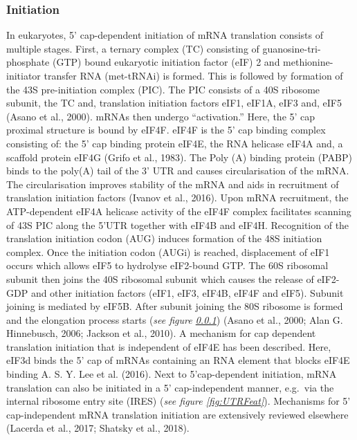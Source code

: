 \documentclass[
  12pt,
  openany]{book}
\begin{document}
\subsubsection{Initiation} \label{initiation}

In eukaryotes, 5' cap-dependent initiation of mRNA translation consists of multiple stages. First, a ternary complex (TC) consisting of guanosine-tri-phosphate (GTP) bound eukaryotic initiation factor (eIF) 2 and methionine-initiator transfer RNA (met-tRNAi) is formed. This is followed by formation of the 43S pre-initiation complex (PIC). The PIC consists of a 40S ribosome subunit, the TC and, translation initiation factors eIF1, eIF1A, eIF3 and, eIF5 (Asano et al., 2000). mRNAs then undergo ``activation.'' Here, the 5' cap proximal structure is bound by eIF4F. eIF4F is the 5' cap binding complex consisting of: the 5' cap binding protein eIF4E, the RNA helicase eIF4A and, a scaffold protein eIF4G (Grifo et al., 1983). The Poly (A) binding protein (PABP) binds to the poly(A) tail of the 3' UTR and causes circularisation of the mRNA. The circularisation improves stability of the mRNA and aids in recruitment of translation initiation factors (Ivanov et al., 2016). Upon mRNA recruitment, the ATP-dependent eIF4A helicase activity of the eIF4F complex facilitates scanning of 43S PIC along the 5'UTR together with eIF4B and eIF4H. Recognition of the translation initiation codon (AUG) induces formation of the 48S initiation complex. Once the initiation codon (AUGi) is reached, displacement of eIF1 occurs which allows eIF5 to hydrolyse eIF2-bound GTP. The 60S ribosomal subunit then joins the 40S ribosomal subunit which causes the release of eIF2-GDP and other initiation factors (eIF1, eIF3, eIF4B, eIF4F and eIF5). Subunit joining is mediated by eIF5B. After subunit joining the 80S ribosome is formed and the elongation process starts (\emph{see figure \ref{initiation}}) (Asano et al., 2000; Alan G. Hinnebusch, 2006; Jackson et al., 2010). A mechanism for cap dependent translation initiation that is independent of eIF4E has been described. Here, eIF3d binds the 5' cap of mRNAs containing an RNA element that blocks eIF4E binding A. S. Y. Lee et al. (2016). Next to 5'cap-dependent initiation, mRNA translation can also be initiated in a 5' cap-independent manner, e.g.~via the internal ribosome entry site (IRES) (\emph{see figure \ref{fig:UTRFeat}}). Mechanisms for 5' cap-independent mRNA translation initiation are extensively reviewed elsewhere (Lacerda et al., 2017; Shatsky et al., 2018).
\end{document}
